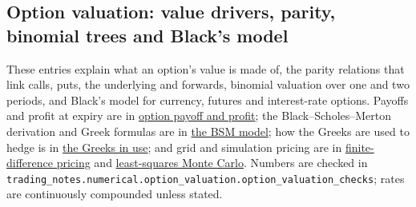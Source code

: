 \subsection{Option valuation: value drivers, parity, binomial trees and Black's model}

These entries explain what an option's value is made of, the parity relations that link calls, puts, the underlying and forwards, binomial valuation over one and two periods, and Black's model for currency, futures and interest-rate options. Payoffs and profit at expiry are in \hyperref[meth:option-payoff-profit]{option payoff and profit}; the Black--Scholes--Merton derivation and Greek formulas are in \hyperref[mod:black-scholes-merton]{the BSM model}; how the Greeks are used to hedge is in \hyperref[meth:greeks-delta-gamma-hedging]{the Greeks in use}; and grid and simulation pricing are in \hyperref[meth:finite-difference-option-pricing]{finite-difference pricing} and \hyperref[meth:least-squares-monte-carlo]{least-squares Monte Carlo}. Numbers are checked in \nolinkurl{trading_notes.numerical.option_valuation.option_valuation_checks}; rates are continuously compounded unless stated.

